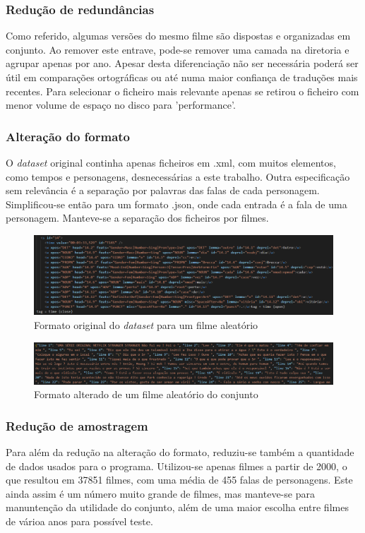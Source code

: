 \documentclass{article}
\begin{document}
\subsubsection{Redução de redundâncias}
Como referido, algumas versões do mesmo filme são dispostas e organizadas em conjunto. Ao remover este entrave, pode-se remover uma camada na diretoria e agrupar apenas por ano. Apesar desta diferenciação não ser necessária poderá ser útil em comparações ortográficas ou até numa maior confiança de traduções mais recentes. Para selecionar o ficheiro mais relevante apenas se retirou o ficheiro com menor volume de espaço no disco para 'performance'.

\subsubsection{Alteração do formato}
O \textit{dataset} original continha apenas ficheiros em .xml, com muitos elementos, como tempos e personagens, desnecessárias a este trabalho. Outra especificação sem relevância é a separação por palavras das falas de cada personagem. Simplificou-se então para um formato .json, onde cada entrada é a fala de uma personagem. Manteve-se a separação dos ficheiros por filmes.

\begin{figure}
	\centering
    \includegraphics[scale=0.3]{xml.png}
    \caption{Formato original do \textit{dataset} para um filme aleatório}
    \label{xmlimg}
\end{figure}

\begin{figure}
	\centering
    \includegraphics[scale=0.3]{json.png}
    \caption{Formato alterado de um filme aleatório do conjunto}
    \label{jsonimg}
\end{figure}

\subsubsection{Redução de amostragem}
Para além da redução na alteração do formato, reduziu-se também a quantidade de dados usados para o programa. Utilizou-se apenas filmes a partir de 2000, o que resultou em 37851 filmes, com uma média de 455 falas de personagens. Este ainda assim é um número muito grande de filmes, mas manteve-se para manuntenção da utilidade do conjunto, além de uma maior escolha entre filmes de várioa anos para possível teste.
\end{document}
